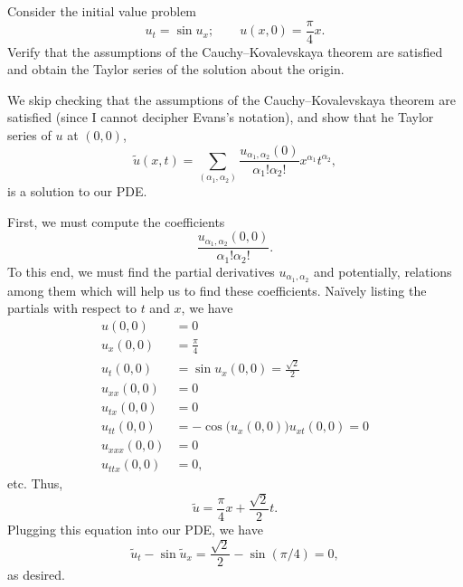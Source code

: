 \begin{problem}
  Consider the initial value problem
  \[
    u_t=\sin u_x;\qquad u(x,0)=\frac{\pi}{4}x.
  \]
  Verify that the assumptions of the Cauchy--Kovalevskaya theorem are
  satisfied and obtain the Taylor series of the solution about the origin.
\end{problem}
\begin{solution}

  We skip checking that the assumptions of the Cauchy--Kovalevskaya theorem
  are satisfied (since I cannot decipher Evans's notation), and show that
  he Taylor series of \(u\) at \((0,0)\),
  \[
    \tilde u(x,t)=\sum_{(\alpha_1,\alpha_2)}
    \frac{u_{\alpha_1,\alpha_2}(0)}{\alpha_1!\alpha_2!} x^{\alpha_1}t^{\alpha_2},
  \]
  is a solution to our PDE.

  First, we must compute the coefficients
  \[
    \frac{u_{\alpha_1,\alpha_2}(0,0)}{\alpha_1!\alpha_2!}.
  \]
  To this end, we must find the partial derivatives
  \(u_{\alpha_1,\alpha_2}\) and potentially, relations among them which
  will help us to find these coefficients. Naïvely listing the partials
  with respect to \(t\) and \(x\), we have
  \begin{align*}
    u(0,0)&=0\\
    u_x(0,0)&=\frac{\pi}{4}\\
    u_t(0,0)&=\sin u_x(0,0)=\frac{\sqrt{2}}{2}\\
    u_{xx}(0,0)&=0\\
    u_{tx}(0,0)&=0\\
    u_{tt}(0,0)&=-\cos\bigl(u_x(0,0)\bigr)u_{xt}(0,0)=0\\
    u_{xxx}(0,0)&=0\\
    u_{ttx}(0,0)&=0,
  \end{align*}
  etc. Thus,
  \[
    \tilde u=\frac{\pi}{4}x+\frac{\sqrt{2}}{2}t.
  \]
  Plugging this equation into our PDE, we have
  \[
    \tilde u_t-\sin\tilde u_x=\frac{\sqrt{2}}{2}-\sin(\pi/4)=0,
  \]
  as desired.
\end{solution}
\newpage


